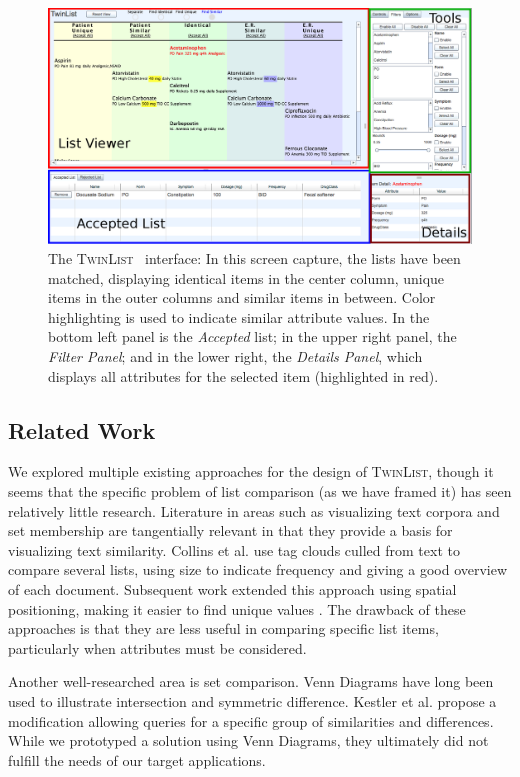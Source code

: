 \documentclass{chi2009}
\newcommand{\TwinList}{\textsc{TwinList}}
\newcommand{\Details}{\textit{Details Panel}}
\newcommand{\Filters}{\textit{Filter Panel}}
\begin{document}
\begin{figure}[t]
\begin{center}
\includegraphics[width=1\linewidth]{img/interface2.png}
\end{center}
   \caption{The \TwinList~ interface: In this screen capture, the lists have been matched, displaying identical items in the center column, unique items in the outer columns and similar items in between. Color highlighting is used to indicate similar attribute values. In the bottom left panel is the \textit{Accepted} list; in the upper right panel, the \Filters; and in the lower right, the \Details, which displays all attributes for the selected item (highlighted in red).}
   \label{fig:interface}
\end{figure}

\subsection{Related Work}
We explored multiple existing approaches for the design of \TwinList, though it seems that the specific problem of list comparison (as we have framed it) has seen relatively little research. Literature in areas such as visualizing text corpora and set membership are tangentially relevant in that they provide a basis for visualizing text similarity.  Collins et al. \cite{collins2009parallel} use tag clouds culled from text to compare several lists, using size to indicate frequency and giving a good overview of each document. Subsequent work extended this approach using spatial positioning, making it easier to find unique values \cite{conwaytuscon11}. The drawback of these approaches is that they are less useful in comparing specific list items, particularly when attributes must be considered.

Another well-researched area is set comparison. Venn Diagrams have long been used to illustrate intersection and symmetric difference. Kestler et al. \cite{kestler2005generalized} propose a modification allowing queries for a specific group of similarities and differences. While we prototyped a solution using Venn Diagrams, they ultimately did not fulfill the needs of our target applications.
\end{document}
